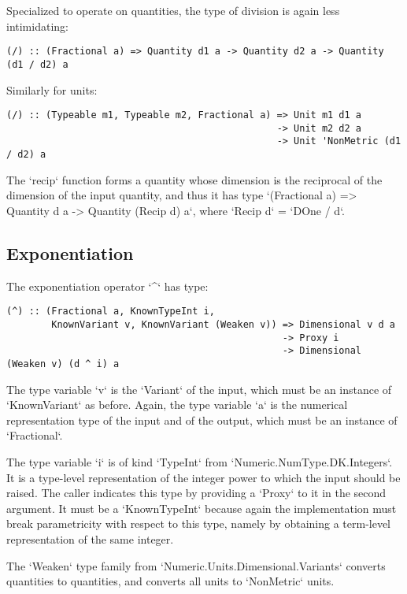 \documentclass[11pt]{report}
\begin{document}
Specialized to operate on quantities, the type of division is again less intimidating:

\begin{lstlisting}
(/) :: (Fractional a) => Quantity d1 a -> Quantity d2 a -> Quantity (d1 / d2) a
\end{lstlisting}

Similarly for units:

\begin{lstlisting}
(/) :: (Typeable m1, Typeable m2, Fractional a) => Unit m1 d1 a
                                                -> Unit m2 d2 a
                                                -> Unit 'NonMetric (d1 / d2) a
\end{lstlisting}

The `recip` function forms a quantity whose dimension is the reciprocal of the dimension of the input quantity, and thus it has type
`(Fractional a) => Quantity d a -> Quantity (Recip d) a`, where `Recip d` = `DOne / d`. %

\subsection{Exponentiation}

The exponentiation operator `^` has type:

\begin{lstlisting}
(^) :: (Fractional a, KnownTypeInt i,
        KnownVariant v, KnownVariant (Weaken v)) => Dimensional v d a
                                                 -> Proxy i
                                                 -> Dimensional (Weaken v) (d ^ i) a
\end{lstlisting}

The type variable `v` is the `Variant` of the input, which must be an instance of `KnownVariant` as before. Again, the type variable `a` is
the numerical representation type of the input and of the output, which must be an instance of `Fractional`.

The type variable `i` is of kind `TypeInt` from `Numeric.NumType.DK.Integers`. It is a type-level representation of the integer power to which
the input should be raised. The caller indicates this type by providing a `Proxy` to it in the second argument. It must be a `KnownTypeInt` because
again the implementation must break parametricity with respect to this type, namely by obtaining a term-level representation of the same integer.

The `Weaken` type family from `Numeric.Units.Dimensional.Variants` converts quantities to quantities, and converts all units to `NonMetric` units.
\end{document}
